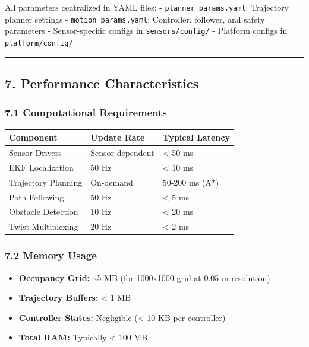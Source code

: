 All parameters centralized in YAML files: -
\texttt{planner\_params.yaml}: Trajectory planner settings -
\texttt{motion\_params.yaml}: Controller, follower, and safety
parameters - Sensor-specific configs in \texttt{sensors/config/} -
Platform configs in \texttt{platform/config/}

\begin{center}\rule{0.5\linewidth}{0.5pt}\end{center}

\hypertarget{performance-characteristics}{%
\subsection{7. Performance
Characteristics}\label{performance-characteristics}}

\hypertarget{computational-requirements}{%
\subsubsection{7.1 Computational
Requirements}\label{computational-requirements}}

\begin{longtable}[]{@{}lll@{}}
\toprule\noalign{}
Component & Update Rate & Typical Latency \\
\midrule\noalign{}
\endhead
\bottomrule\noalign{}
\endlastfoot
Sensor Drivers & Sensor-dependent & \textless{} 50 ms \\
EKF Localization & 50 Hz & \textless{} 10 ms \\
Trajectory Planning & On-demand & 50-200 ms (A*) \\
Path Following & 50 Hz & \textless{} 5 ms \\
Obstacle Detection & 10 Hz & \textless{} 20 ms \\
Twist Multiplexing & 20 Hz & \textless{} 2 ms \\
\end{longtable}

\hypertarget{memory-usage}{%
\subsubsection{7.2 Memory Usage}\label{memory-usage}}

\begin{itemize}
\tightlist
\item
  \textbf{Occupancy Grid:} \textasciitilde5 MB (for 1000x1000 grid at
  0.05 m resolution)
\item
  \textbf{Trajectory Buffers:} \textless{} 1 MB
\item
  \textbf{Controller States:} Negligible (\textless{} 10 KB per
  controller)
\item
  \textbf{Total RAM:} Typically \textless{} 100 MB
\end{itemize}

